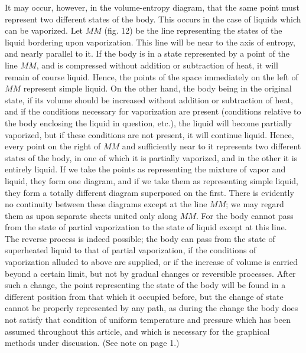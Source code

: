 \documentclass[11pt]{article}
\begin{document}
It may occur, however, in the volume-entropy diagram, that the same point must represent two different states of the body. This occurs in the case of liquids which can be vaporized. Let $MM$ (fig. 12) be the line representing the states of the liquid bordering upon vaporization. This line will be near to the axis of entropy, and nearly parallel to it. If the body is in a state represented by a point of the line $MM$, and is compressed without addition or subtraction of heat, it will remain of course liquid. Hence, the points of the space immediately on the left of $MM$ represent simple liquid. On the other hand, the body being in the original state, if its volume should be increased without addition or subtraction of heat, and if the conditions necessary for vaporization are present (conditions relative to the body enclosing the liquid in question, etc.), the liquid will become partially vaporized, but if these conditions are not present, it will continue liquid. Hence, every point on the right of $MM$ and sufficiently near to it represents two different states of the body, in one of which it is partially vaporized, and in the other it is entirely liquid. If we take the points as representing the mixture of vapor and liquid, they form one diagram, and if we take them as representing simple liquid, they form a totally different diagram superposed on the first. There is evidently no continuity between these diagrams except at the line $MM$; we may regard them as upon separate sheets united only along $MM$. For the body cannot pass from the state of partial vaporization to the state of liquid except at this line. The reverse process is indeed possible; the body can pass from the state of superheated liquid to that of partial vaporization, if the conditions of vaporization alluded to above are supplied, or if the increase of volume is carried beyond a certain limit, but not by gradual changes or reversible processes. After such a change, the point representing the state of the body will be found in a different position from that which it occupied before, but the change of state cannot be properly represented by any path, as during the change the body does not satisfy that condition of uniform temperature and pressure which has been assumed throughout this article, and which is necessary for the graphical methods under discussion. (See note on page 1.)

\begin{figure}[h]
\centering
{}
\end{figure}
\end{document}
